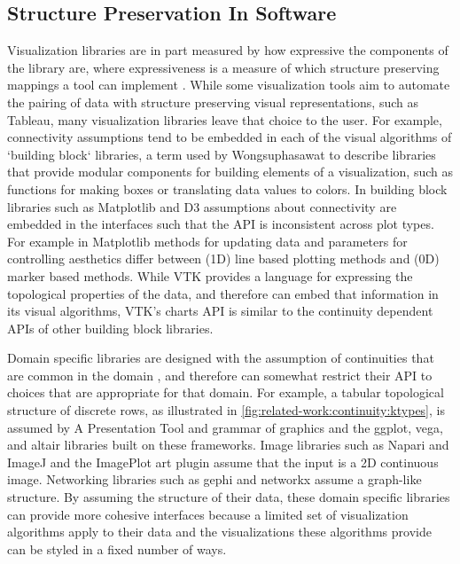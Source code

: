 \documentclass[review]{vgtc}
\theoremstyle{definition}
\theoremstyle{remark}
\begin{document}
\subsection{Structure Preservation In Software}
\label{sec:related-work:software}
Visualization libraries are in part measured by how expressive the components of the library are, where expressiveness is a measure of which structure preserving mappings a tool can implement \cite{mackinlayAutomatingDesignGraphical1986}. While some visualization tools aim to automate the pairing of data with structure preserving visual representations, such as Tableau\cite{StoltePolaris2002,hanrahanVizQL2006,MackinlayShowme2007}, many visualization libraries leave that choice to the user. For example, connectivity assumptions tend to be embedded in each of the visual algorithms of `building block` libraries, a term used by Wongsuphasawat \cite{wongsuphasawatNavigatingWideWorld2021,wongsuphasawatNavigatingWideWorld2020} to describe libraries that provide modular components for building elements of a visualization, such as functions for making boxes or translating data values to colors. In building block libraries such as Matplotlib\cite{hunterMatplotlib2DGraphics2007} and D3\cite{bostockDataDrivenDocuments2011} assumptions about connectivity are embedded in the interfaces such that the API is inconsistent across plot types. For example in Matplotlib methods for updating data and parameters for controlling aesthetics differ between (1D) line based plotting methods and (0D) marker based methods. While VTK\cite{hanwellVisualizationToolkitVTK2015,geveciVTK2012} provides a language for expressing the topological properties of the data, and therefore can embed that information in its visual algorithms, VTK's charts API is similar to the continuity dependent APIs of other building block libraries.

Domain specific libraries are designed with the assumption of continuities that are common in the domain \cite{HeerSoftware2006}, and therefore can somewhat restrict their API to choices that are appropriate for that domain. For example, a tabular topological structure of discrete rows, as illustrated in \autoref{fig:related-work:continuity:ktypes}, is assumed by A Presentation Tool\cite{mackinlayAutomatingDesignGraphical1986, mackinlayAutomatingDesignGraphical1986} and grammar of graphics\cite{wilkinsonGrammarGraphics2005} and the ggplot\cite{wickhamGgplot2ElegantGraphics2016}, vega\cite{satyanarayanDeclarativeInteractionDesign2014}, and altair\cite{vanderplasAltairInteractiveStatistical2018} libraries built on these frameworks. Image libraries such as Napari\cite{nicholas_sofroniew_2021_4533308} and ImageJ\cite{schneiderNIHImageImageJ2012} and the ImagePlot\cite{studiesCulturevisImageplot2021} art plugin assume that the input is a 2D continuous image. Networking libraries such as gephi\cite{bastianGephiOpenSource2009} and networkx\cite{HagbergExploringNetwork2008} assume a graph-like structure. By assuming the structure of their data, these domain specific libraries can provide more cohesive interfaces because a limited set of visualization algorithms apply to their data and the visualizations these algorithms provide can be styled in a fixed number of ways.
\end{document}
